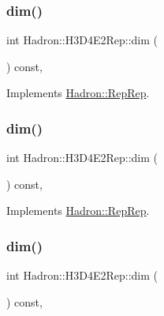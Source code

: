 \subsubsection{\texorpdfstring{dim()}{dim()}\hspace{0.1cm}{\footnotesize\ttfamily [3/5]}}
{\footnotesize\ttfamily int Hadron\+::\+H3\+D4\+E2\+Rep\+::dim (\begin{DoxyParamCaption}{ }\end{DoxyParamCaption}) const\hspace{0.3cm}{\ttfamily [inline]}, {\ttfamily [virtual]}}



Implements \mbox{\hyperlink{structHadron_1_1RepRep_a92c8802e5ed7afd7da43ccfd5b7cd92b}{Hadron\+::\+Rep\+Rep}}.

\mbox{\label{structHadron_1_1H3D4E2Rep_ae4a78fda385ad21cf43f989f5b3aec5f}} 
\subsubsection{\texorpdfstring{dim()}{dim()}\hspace{0.1cm}{\footnotesize\ttfamily [4/5]}}
{\footnotesize\ttfamily int Hadron\+::\+H3\+D4\+E2\+Rep\+::dim (\begin{DoxyParamCaption}{ }\end{DoxyParamCaption}) const\hspace{0.3cm}{\ttfamily [inline]}, {\ttfamily [virtual]}}



Implements \mbox{\hyperlink{structHadron_1_1RepRep_a92c8802e5ed7afd7da43ccfd5b7cd92b}{Hadron\+::\+Rep\+Rep}}.

\mbox{\label{structHadron_1_1H3D4E2Rep_ae4a78fda385ad21cf43f989f5b3aec5f}} 
\subsubsection{\texorpdfstring{dim()}{dim()}\hspace{0.1cm}{\footnotesize\ttfamily [5/5]}}
{\footnotesize\ttfamily int Hadron\+::\+H3\+D4\+E2\+Rep\+::dim (\begin{DoxyParamCaption}{ }\end{DoxyParamCaption}) const\hspace{0.3cm}{\ttfamily [inline]}, {\ttfamily [virtual]}}



